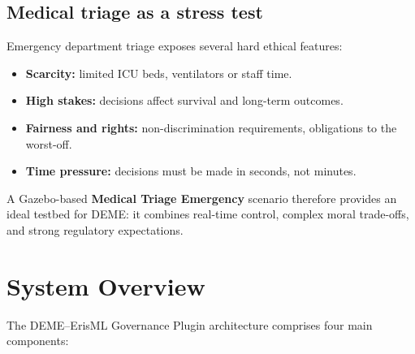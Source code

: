 \documentclass[11pt]{article}
\begin{document}
\subsection{Medical triage as a stress test}

Emergency department triage exposes several hard ethical features:

\begin{itemize}
  \item \textbf{Scarcity:} limited ICU beds, ventilators or staff time.
  \item \textbf{High stakes:} decisions affect survival and long-term outcomes.
  \item \textbf{Fairness and rights:} non-discrimination requirements, obligations to the worst-off.
  \item \textbf{Time pressure:} decisions must be made in seconds, not minutes.
\end{itemize}

A Gazebo-based \textbf{Medical Triage Emergency} scenario therefore provides an ideal testbed for DEME: it combines real-time control, complex moral trade-offs, and strong regulatory expectations.

\section{System Overview}

The DEME--ErisML Governance Plugin architecture comprises four main components:
\end{document}
